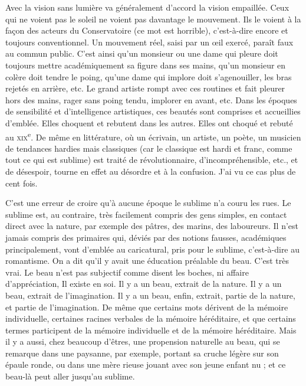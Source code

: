 \documentclass[french,twoside]{book} %
\begin{document}
Avec la vision sans lumière va généralement d’accord la vision empaillée. Ceux qui ne voient pas le soleil ne voient pas davantage le mouvement. Ils le voient à la façon des acteurs du Conservatoire (ce mot est horrible), c’est-à-dire encore et toujours conventionnel. Un mouvement réel, saisi par un œil exercé, paraît faux au commun public. C’est ainsi qu’un monsieur ou une dame qui pleure doit toujours mettre académiquement sa figure dans ses mains, qu’un monsieur en colère doit tendre le poing, qu’une dame qui implore doit s’agenouiller, les bras rejetés en arrière, etc. Le grand artiste rompt avec ces routines et fait pleurer hors des mains, rager sans poing tendu, implorer en avant, etc. Dans les époques de sensibilité et d’intelligence artistiques, ces beautés sont comprises et accueillies d’emblée. Elles choquent et rebutent dans les autres. Elles ont choqué et rebuté au \textsc{xix}\textsuperscript{e}. De même en littérature, où un écrivain, un artiste, un poète, un musicien de tendances hardies mais classiques (car le classique est hardi et franc, comme tout ce qui est sublime) est traité de révolutionnaire, d’incompréhensible, etc., et de désespoir, tourne en effet au désordre et à la confusion. J’ai vu ce cas plus de cent fois.\par
C’est une erreur de croire qu’à aucune époque le sublime n’a couru les rues. Le sublime est, au contraire, très facilement compris des gens simples, en contact direct avec la nature, par exemple des pâtres, des marins, des laboureurs. Il n’est jamais compris des primaires qui, déviés par des notions fausses, académiques principalement, vont d’emblée au caricatural, pris pour le sublime, c’est-à-dire au romantisme. On a dit qu’il y avait une éducation préalable du beau. C’est très vrai. Le beau n’est pas subjectif comme disent les boches, ni affaire d’appréciation, Il existe en soi. Il y a un beau, extrait de la nature. Il y a un beau, extrait de l’imagination. Il y a un beau, enfin, extrait, partie de la nature, et partie de l’imagination. De même que certains mots dérivent de la mémoire individuelle, certaines racines verbales de la mémoire héréditaire, et que certains termes participent de la mémoire individuelle et de la mémoire héréditaire. Mais il y a aussi, chez beaucoup d’êtres, une propension naturelle au beau, qui se remarque dans une paysanne, par exemple, portant sa cruche légère sur son épaule ronde, ou dans une mère rieuse jouant avec son jeune enfant nu ; et ce beau-là peut aller jusqu’au sublime.\par
\end{document}
